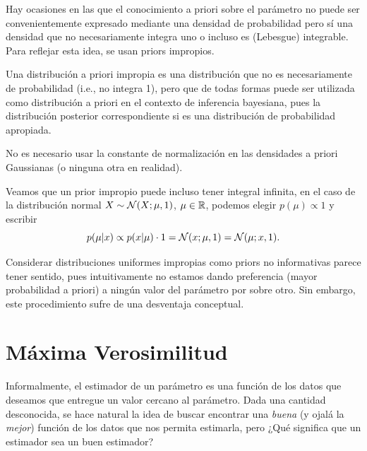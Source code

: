Hay ocasiones en las que el conocimiento a priori sobre el parámetro no puede ser convenientemente expresado mediante una densidad de probabilidad pero sí una densidad que no necesariamente integra uno o incluso es (Lebesgue) integrable. Para reflejar esta idea, se usan priors impropios.

\begin{definition} Una distribución a priori impropia es una distribución que no es necesariamente de probabilidad (i.e., no integra 1), pero que de todas formas puede ser utilizada como distribución a priori en el contexto de inferencia bayesiana, pues la distribución posterior correspondiente si es una distribución de probabilidad apropiada. 
\end{definition}

\begin{remark} No es necesario usar la constante de normalización en las densidades a priori Gaussianas (o ninguna otra en realidad).
\end{remark}

\begin{remark} Veamos que un prior impropio puede incluso tener integral infinita, en el caso de la distribución normal $X\sim{\mathcal N}(X;\mu,1)$,  $\mu\in{\mathbb R}$, podemos elegir $p(\mu)\propto1$ y escribir 
\begin{equation}
	p(\mu|x)\propto p(x|\mu)\cdot 1 = {\mathcal N}(x;\mu,1) = {\mathcal N}(\mu;x,1). 
\end{equation}
	
\end{remark}

Considerar distribuciones uniformes impropias como priors no informativas parece tener sentido, pues intuitivamente no estamos dando preferencia (mayor probabilidad a priori) a ningún valor del parámetro por sobre otro. Sin embargo, este procedimiento sufre de una desventaja conceptual.


\section{Máxima Verosimilitud} %
\label{sec:estimador_de_máxima_verosimilitud}

Informalmente, el estimador de un parámetro es una función de los datos que deseamos que entregue un valor cercano al parámetro. Dada una cantidad desconocida, se hace natural la idea de buscar encontrar una \emph{buena} (y ojalá la \emph{mejor}) función de los datos que nos permita estimarla, pero ¿Qué significa que un estimador sea un buen estimador?

